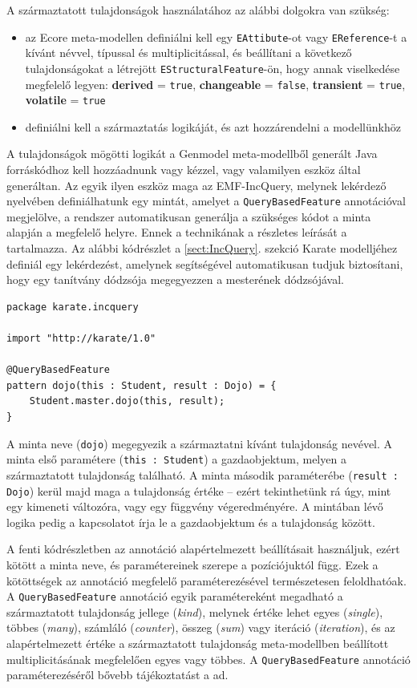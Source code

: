 A származtatott tulajdonságok használatához az alábbi dolgokra van szükség:
\begin{itemize}
    \item az Ecore meta-modellen definiálni kell egy \texttt{EAttibute}-ot vagy \texttt{EReference}-t a kívánt névvel, típussal és multiplicitással, és beállítani a következő tulajdonságokat a létrejött \texttt{EStructuralFeature}-ön, hogy annak viselkedése megfelelő legyen: \textbf{derived} = \texttt{true}, \textbf{changeable} = \texttt{false}, \textbf{transient} = \texttt{true}, \textbf{volatile} = \texttt{true}
    \item definiálni kell a származtatás logikáját, és azt hozzárendelni a modellünkhöz
\end{itemize}
A tulajdonságok mögötti logikát a Genmodel meta-modellből generált Java forráskódhoz kell hozzáadnunk vagy kézzel, vagy valamilyen eszköz által generáltan.
Az egyik ilyen eszköz maga az EMF-IncQuery, melynek lekérdező nyelvében definiálhatunk egy mintát, amelyet a \texttt{QueryBasedFeature} annotációval megjelölve, a rendszer automatikusan generálja a szükséges kódot a minta alapján a megfelelő helyre. 
Ennek a technikának a részletes leírását a \cite{DerivedFeature} tartalmazza.
Az alábbi kódrészlet a \ref{sect:IncQuery}. szekció Karate modelljéhez definiál egy lekérdezést, amelynek segítségével automatikusan tudjuk biztosítani, hogy egy tanítvány dódzsója megegyezzen a mesterének dódzsójával.
%
\begin{lstlisting}
package karate.incquery

import "http://karate/1.0"

@QueryBasedFeature
pattern dojo(this : Student, result : Dojo) = {
    Student.master.dojo(this, result);
}
\end{lstlisting}
%
A minta neve (\texttt{dojo}) megegyezik a származtatni kívánt tulajdonság nevével.
A minta első paramétere (\texttt{this : Student}) a gazdaobjektum, melyen a származtatott tulajdonság található.
A minta második paraméterébe (\texttt{result : Dojo}) kerül majd maga a tulajdonság értéke -- ezért tekinthetünk rá úgy, mint egy kimeneti változóra, vagy egy függvény végeredményére.
A mintában lévő logika pedig a kapcsolatot írja le a gazdaobjektum és a tulajdonság között.

A fenti kódrészletben az annotáció alapértelmezett beállításait használjuk, ezért kötött a minta neve, és paramétereinek szerepe a pozíciójuktól függ.
Ezek a kötöttségek az annotáció megfelelő paraméterezésével természetesen feloldhatóak.
A \texttt{QueryBasedFeature} annotáció egyik paramétereként megadható a származtatott tulajdonság jellege (\emph{kind}), melynek értéke lehet egyes (\emph{single}), többes (\emph{many}), számláló (\emph{counter}), összeg (\emph{sum}) vagy iteráció (\emph{iteration}), és az alapértelmezett értéke a származtatott tulajdonság meta-modellben beállított multiplicitásának megfelelően egyes vagy többes.
A \texttt{QueryBasedFeature} annotáció paraméterezéséről bővebb tájékoztatást a \cite{DerivedFeature} ad.

